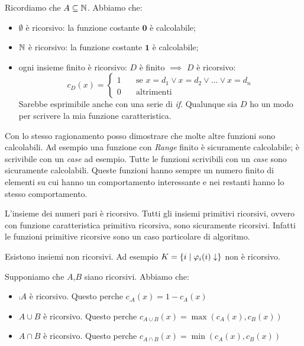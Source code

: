 Ricordiamo che $A \subseteq \mathbb{N}$. Abbiamo che:
\begin{itemize}
    \item $\emptyset$ è ricorsivo: la funzione costante $\bm{0}$ è calcolabile;
    \item $\mathbb{N}$ è ricorsivo: la funzione costante $\bm{1}$ è calcolabile;
    \item ogni insieme finito è ricorsivo: $D$ è finito $\implies$ $D$ è ricorsivo:
    \begin{equation*}
        c_{D}(x) = 
        \begin{cases}
            1 \quad & \text{se $x = d_{1} \lor x = d_{2} \lor \dotsc \lor x = d_{n}$}  \\
            0 \quad & \text{altrimenti}
        \end{cases}
    \end{equation*}
    Sarebbe esprimibile anche con una serie di \textit{if}. Qualunque sia $D$ ho un modo per scrivere la mia
    funzione caratteristica.
\end{itemize}

Con lo stesso ragionamento posso dimostrare che molte altre funzioni sono calcolabili. Ad esempio
una funzione con \textit{Range} finito è sicuramente calcolabile; è scrivibile con un \textit{case}
ad esempio.  Tutte le funzioni scrivibili con un \textit{case} sono sicuramente calcolabili. Queste
funzioni hanno sempre un numero finito di elementi su cui hanno un comportamento interessante e nei
restanti hanno lo stesso comportamento.

L'insieme dei numeri pari è ricorsivo. Tutti gli insiemi primitivi ricorsivi, ovvero con funzione
caratteristica primitiva ricorsiva, sono sicuramente ricorsivi. Infatti le funzioni primitive
ricorsive sono un caso particolare di algoritmo.

Esistono insiemi non ricorsivi. Ad esempio $K = \{i \mid \varphi_{i}(i) \downarrow\}$ non è ricorsivo.

Supponiamo che $A$,$B$ siano ricorsivi. Abbiamo che:
\begin{itemize}
    \item $\comp{A}$ è ricorsivo. Questo perche $c_{\comp{A}}(x) = 1 - c_{A}(x)$
    \item $A \cup B$ è ricorsivo. Questo perche $c_{A \cup B}(x) = \max(c_{A}(x),c_{B}(x))$
    \item $A \cap B$ è ricorsivo. Questo perche $c_{A \cap B}(x) = \min(c_{A}(x),c_{B}(x))$
\end{itemize}

